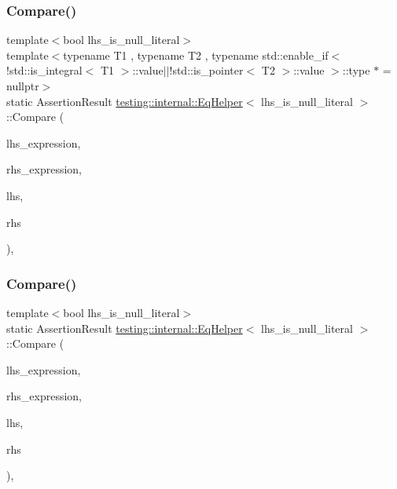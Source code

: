 \subsubsection{\texorpdfstring{Compare()}{Compare()}\hspace{0.1cm}{\footnotesize\ttfamily [4/8]}}
{\footnotesize\ttfamily template$<$bool lhs\+\_\+is\+\_\+null\+\_\+literal$>$ \\
template$<$typename T1 , typename T2 , typename std\+::enable\+\_\+if$<$!std\+::is\+\_\+integral$<$ T1 $>$\+::value$\vert$$\vert$!std\+::is\+\_\+pointer$<$ T2 $>$\+::value $>$\+::type $\ast$  = nullptr$>$ \\
static Assertion\+Result \mbox{\hyperlink{classtesting_1_1internal_1_1_eq_helper}{testing\+::internal\+::\+Eq\+Helper}}$<$ lhs\+\_\+is\+\_\+null\+\_\+literal $>$\+::Compare (\begin{DoxyParamCaption}\item[{const char $\ast$}]{lhs\+\_\+expression,  }\item[{const char $\ast$}]{rhs\+\_\+expression,  }\item[{const T1 \&}]{lhs,  }\item[{const T2 \&}]{rhs }\end{DoxyParamCaption})\hspace{0.3cm}{\ttfamily [inline]}, {\ttfamily [static]}}

\mbox{\label{classtesting_1_1internal_1_1_eq_helper_aaa42c0059bb3dcc43d556243febb5f1c}} 
\subsubsection{\texorpdfstring{Compare()}{Compare()}\hspace{0.1cm}{\footnotesize\ttfamily [5/8]}}
{\footnotesize\ttfamily template$<$bool lhs\+\_\+is\+\_\+null\+\_\+literal$>$ \\
static Assertion\+Result \mbox{\hyperlink{classtesting_1_1internal_1_1_eq_helper}{testing\+::internal\+::\+Eq\+Helper}}$<$ lhs\+\_\+is\+\_\+null\+\_\+literal $>$\+::Compare (\begin{DoxyParamCaption}\item[{const char $\ast$}]{lhs\+\_\+expression,  }\item[{const char $\ast$}]{rhs\+\_\+expression,  }\item[{\mbox{\hyperlink{namespacetesting_1_1internal_a05c6bd9ede5ccdf25191a590d610dcc6}{Biggest\+Int}}}]{lhs,  }\item[{\mbox{\hyperlink{namespacetesting_1_1internal_a05c6bd9ede5ccdf25191a590d610dcc6}{Biggest\+Int}}}]{rhs }\end{DoxyParamCaption})\hspace{0.3cm}{\ttfamily [inline]}, {\ttfamily [static]}}


